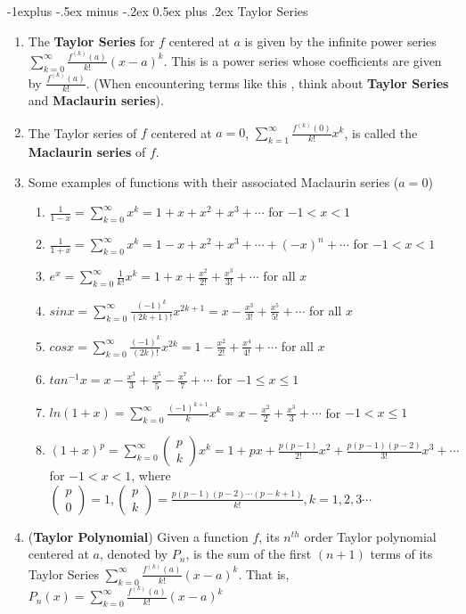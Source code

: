\documentclass[10pt, landscape]{article}
\makeatletter
\renewcommand{\subsection}{\@startsection{subsection}{2}{0mm}%
                                {-1explus -.5ex minus -.2ex}%
                                {0.5ex plus .2ex}%
                                {\normalfont\normalsize\bfseries}}
\makeatother
\begin{document}
\begin{multicols}{4}
\subsection{Taylor Series}
\begin{enumerate}
    \item The \textbf{Taylor Series} for $f$ centered at $a$ is given by the infinite power series $\sum_{k=0}^{\infty}\frac{f^{(k)}(a)}{k!}(x-a)^k$. This is a power series whose coefficients are given by $\frac{f^{(k)}(a)}{k!}$. (When encountering terms like this , think about \textbf{Taylor Series} and \textbf{Maclaurin series}).
    \item The Taylor series of $f$ centered at $a=0$, $\sum_{k=1}^{\infty}\frac{f^{(k)}(0)}{k!}x^k$, is called the \textbf{Maclaurin series} of $f$.
    \item Some examples of functions with their associated Maclaurin series ($a=0$)
    \begin{enumerate}
        \item $\frac{1}{1-x}=\sum_{k=0}^{\infty}x^k=1+x+x^2+x^3+\cdots$ for $-1 < x <1$
        \item $\frac{1}{1+x}=\sum_{k=0}^{\infty}x^k=1-x+x^2+x^3+\cdots+(-x)^n+\cdots$ for $-1 < x <1$
        \item $e^x=\sum_{k=0}^{\infty}\frac{1}{k!}x^k=1+x+\frac{x^2}{2!}+\frac{x^3}{3!}+\cdots$ for all $x$
        \item $sinx=\sum_{k=0}^{\infty}\frac{(-1)^k}{(2k+1)!}x^{2k+1}=x-\frac{x^3}{3!}+\frac{x^5}{5!}+\cdots$ for all $x$
        \item $cosx=\sum_{k=0}^{\infty}\frac{(-1)^k}{(2k)!}x^{2k}=1-\frac{x^2}{2!}+\frac{x^4}{4!}+\cdots$ for all $x$
        \item $tan^{-1}x=x-\frac{x^3}{3}+\frac{x^5}{5}-\frac{x^7}{7}+\cdots$ for $-1\leq x\leq 1$
        \item $ln(1+x)=\sum_{k=0}^{\infty}\frac{(-1)^{k+1}}{k}x^k=x-\frac{x^2}{2}+\frac{x^3}{3}+\cdots$ for $-1 < x \leq 1$
        \item $(1+x)^p=\sum_{k=0}^{\infty}
        \begin{pmatrix}
            p \\
            k
        \end{pmatrix}x^k=1+px+\frac{p(p-1)}{2!}x^2+\frac{p(p-1)(p-2)}{3!}x^3+\cdots$ for $-1<x<1$, where $\begin{pmatrix}
            p \\
            0
        \end{pmatrix}=1, \begin{pmatrix}
            p \\
            k
        \end{pmatrix}=\frac{p(p-1)(p-2)\cdots(p-k+1)}{k!}, k=1,2,3\cdots$
    \end{enumerate}
    \item (\textbf{Taylor Polynomial}) Given a function $f$, its $n^{th}$ order Taylor polynomial centered at $a$, denoted by $P_n$, is the sum of the first $(n+1)$ terms of its Taylor Series $\sum_{k=0}^{\infty}\frac{f^{(k)}(a)}{k!}(x-a)^k$. That is, $P_n(x)=\sum_{k=0}^{\infty}\frac{f^{(k)}(a)}{k!}(x-a)^k$
\end{enumerate}


\end{multicols}
\end{document}
